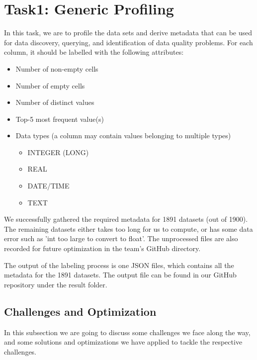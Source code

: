 \documentclass[sigconf]{acmart}
\begin{document}
\section{Task1: Generic Profiling}
In this task,  we are to profile the data sets and derive metadata that can be used for data discovery, querying, and identification of data quality problems. For each column, it should be labelled with the following attributes:
\begin{itemize}
    \item Number of non-empty cells
    \item Number of empty cells
    \item Number of distinct values
    \item Top-5 most frequent value(s)
    \item Data types (a column may contain values belonging to multiple types)
    \begin{itemize}
        \item INTEGER (LONG)
        \item REAL
        \item DATE/TIME
        \item TEXT
    \end{itemize}
\end{itemize}

We successfully gathered the required metadata for 1891 datasets (out of 1900). The remaining datasets either takes too long for us to compute, or has some data error such as 'int too large to convert to float'. The unprocessed files are also recorded for future optimization in the team's GitHub directory.

The output of the labeling process is one JSON files, which contains all the metadata for the 1891 datasets. The output file can be found in our GitHub repository under the result folder.
\subsection{Challenges and Optimization}
In this subsection we are going to discuss some challenges we face along the way, and some solutions and optimizations we have applied to tackle the respective challenges.
\end{document}
